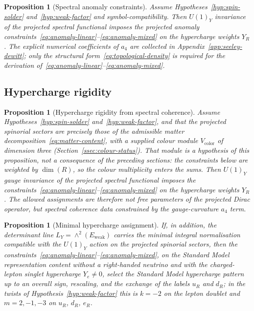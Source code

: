 \documentclass[11pt,a4paper]{article}
\newtheorem{proposition}[theorem]{Proposition}
\theoremstyle{definition}
\theoremstyle{remark}
\begin{document}
    \begin{proposition}[Spectral anomaly constraints]
      \label{prop:spectral-anomaly-constraints}
      Assume Hypotheses~\ref{hyp:spin-solder} and~\ref{hyp:weak-factor} and symbol-compatibility.
      Then $U(1)_Y$ invariance of the projected spectral functional imposes the
      projected anomaly constraints~\eqref{eq:anomaly-linear}--\eqref{eq:anomaly-mixed}
      on the hypercharge weights $Y_R$.
      The explicit numerical coefficients of $a_4$ are collected in
      Appendix~\ref{app:seeley-dewitt}; only the structural
      form~\eqref{eq:topological-density} is required for the
      derivation of~\eqref{eq:anomaly-linear}--\eqref{eq:anomaly-mixed}.
    \end{proposition}

  \subsection{Hypercharge rigidity}
    \label{ssec:hypercharge-rigidity}

    \begin{proposition}[Hypercharge rigidity from spectral coherence]
      \label{prop:hypercharge-rigidity}
      Assume Hypotheses~\ref{hyp:spin-solder} and~\ref{hyp:weak-factor}, and that the projected spinorial
      sectors are precisely those of the admissible
      matter decomposition~\eqref{eq:matter-content}, with a supplied colour module
      $V_{\mathrm{color}}$ of dimension three (Section~\ref{ssec:colour-status}).
      That module is a hypothesis of this proposition, not a consequence of the preceding
      sections: the constraints below are weighted by $\dim(R)$, so the colour multiplicity
      enters the sums.
      Then $U(1)_Y$ gauge invariance of the projected spectral functional imposes
      the constraints~\eqref{eq:anomaly-linear}--\eqref{eq:anomaly-mixed} on the
      hypercharge weights $Y_R$.
      The allowed assignments are therefore not free parameters of the projected Dirac
      operator, but spectral coherence data constrained by the gauge-curvature $a_4$ term.
    \end{proposition}

    \begin{proposition}[Minimal hypercharge assignment]
      \label{prop:minimal-hypercharge}
      If, in addition, the determinant line $L_Y = \wedge^2(E_{\mathrm{weak}})$ carries the minimal
      integral normalisation compatible with the $U(1)_Y$ action on the projected
      spinorial sectors, then the
      constraints~\eqref{eq:anomaly-linear}--\eqref{eq:anomaly-mixed}, on the Standard Model
      representation content without a right-handed neutrino and with the charged-lepton singlet
      hypercharge $Y_e \neq 0$, select the Standard Model hypercharge pattern up to an overall sign,
      rescaling, and the exchange of the labels $u_R$ and $d_R$; in the twists of
      Hypothesis~\ref{hyp:weak-factor} this is $k = -2$ on the lepton doublet and $m = 2, -1, -3$ on
      $u_R$, $d_R$, $e_R$.
    \end{proposition}
\end{document}
